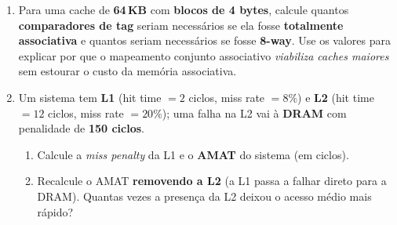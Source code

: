 \documentclass[10pt, a4paper]{article}
\begin{document}
\begin{enumerate}
\item Para uma cache de \textbf{64\,KB} com \textbf{blocos de 4 bytes}, calcule quantos \textbf{comparadores de tag} seriam necess\'{a}rios se ela fosse \textbf{totalmente associativa} e quantos seriam necess\'{a}rios se fosse \textbf{8-way}. Use os valores para explicar por que o mapeamento conjunto associativo \emph{viabiliza caches maiores} sem estourar o custo da mem\'{o}ria associativa.

\item Um sistema tem \textbf{L1} (hit time $=2$ ciclos, miss rate $=8\%$) e \textbf{L2} (hit time $=12$ ciclos, miss rate $=20\%$); uma falha na L2 vai \`{a} \textbf{DRAM} com penalidade de \textbf{150 ciclos}.
\begin{enumerate}
  \item Calcule a \emph{miss penalty} da L1 e o \textbf{AMAT} do sistema (em ciclos).
  \item Recalcule o AMAT \textbf{removendo a L2} (a L1 passa a falhar direto para a DRAM). Quantas vezes a presen\c{c}a da L2 deixou o acesso m\'{e}dio mais r\'{a}pido?
\end{enumerate}

\end{enumerate}
\end{document}
